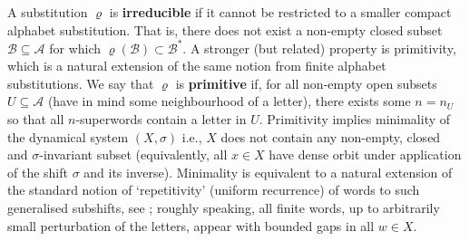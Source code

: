 \documentclass[11pt]{amsart}
\numberwithin{equation}{section}
\theoremstyle{plain}
\theoremstyle{definition}
\newcommand{\mc}{\mathcal}
\newcommand{\A}{\mc A}
\newcommand{\sub}{\varrho}
\begin{document}
A substitution \(\sub\) is \textbf{irreducible} if it cannot be restricted to a smaller compact alphabet substitution. That is, there does not exist a non-empty closed subset \(\mathcal{B} \subseteq \A\) for which \(\sub(\mathcal{B}) \subset \mathcal{B}^\ast\). A stronger (but related) property is primitivity, which is a natural extension of the same notion from finite alphabet substitutions. We say that \(\sub\) is \textbf{primitive} if, for all non-empty open subsets \(U \subseteq \A\) (have in mind some neighbourhood of a letter), there exists some \(n = n_U\) so that all \(n\)-superwords contain a letter in \(U\). Primitivity implies minimality of the dynamical system \((X,\sigma)\) i.e., \(X\) does not contain any non-empty, closed and \(\sigma\)-invariant subset (equivalently, all \(x \in X\) have dense orbit under application of the shift \(\sigma\) and its inverse). Minimality is equivalent to a natural extension of the standard notion of `repetitivity' (uniform recurrence) of words to such generalised subshifts, see \cite[Proposition 2.14]{MRW25}; roughly speaking, all finite words, up to arbitrarily small perturbation of the letters, appear with bounded gaps in all \(w \in X\).
\end{document}
